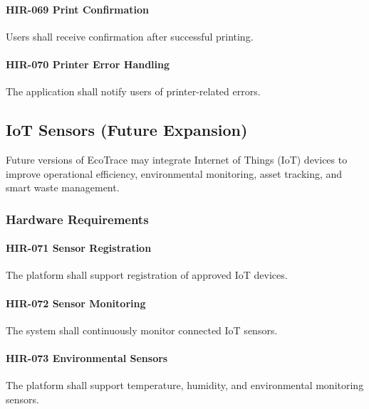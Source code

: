 \paragraph{HIR-069 Print Confirmation}

Users shall receive confirmation after successful printing.

\paragraph{HIR-070 Printer Error Handling}

The application shall notify users of printer-related errors.


\subsection{IoT Sensors (Future Expansion)}

Future versions of EcoTrace may integrate Internet of Things (IoT)
devices to improve operational efficiency, environmental monitoring,
asset tracking, and smart waste management.


\subsubsection*{Hardware Requirements}

\paragraph{HIR-071 Sensor Registration}

The platform shall support registration of approved IoT devices.

\paragraph{HIR-072 Sensor Monitoring}

The system shall continuously monitor connected IoT sensors.

\paragraph{HIR-073 Environmental Sensors}

The platform shall support temperature, humidity, and environmental
monitoring sensors.

